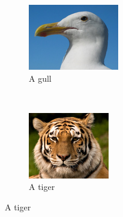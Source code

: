 \documentclass{article}
\begin{document}
\begin{figure}

        \centering
        
        \begin{subfigure}[b]{0.3\textwidth}
                \centering
                \includegraphics[width=\textwidth]{Figs/subfig1}
                \caption{A gull}
                \label{fig:gull}
        \end{subfigure}%
        ~ %
        \begin{subfigure}[b]{0.3\textwidth}
                \centering
                \includegraphics[width=\textwidth,trim=0 10px 0 0,clip=true]{Figs/subfig2}
                \caption{A tiger}
                \label{fig:tiger}
        \end{subfigure}
        

\end{figure}
\end{document}
